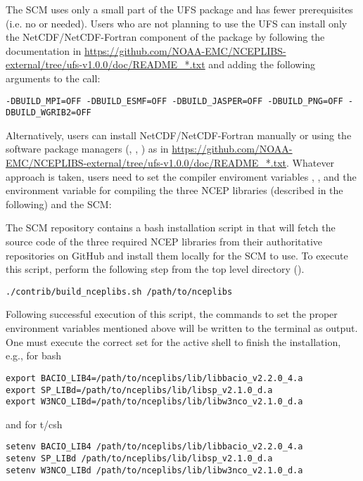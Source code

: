 The SCM uses only a small part of the UFS  package and has fewer prerequisites (i.e. no  or  needed). Users who are not planning to use the UFS can install only the NetCDF/NetCDF-Fortran component of the  package by following the documentation in \url{https://github.com/NOAA-EMC/NCEPLIBS-external/tree/ufs-v1.0.0/doc/README_*.txt} and adding the following arguments to the  call:
\begin{lstlisting}
-DBUILD_MPI=OFF -DBUILD_ESMF=OFF -DBUILD_JASPER=OFF -DBUILD_PNG=OFF -DBUILD_WGRIB2=OFF
\end{lstlisting}
Alternatively, users can install NetCDF/NetCDF-Fortran manually or using the software package managers (, , ) as in \url{https://github.com/NOAA-EMC/NCEPLIBS-external/tree/ufs-v1.0.0/doc/README_*.txt}. Whatever approach is taken, users need to set the compiler enviroment variables ,  ,  and the environment variable  for compiling the three NCEP libraries (described in the following) and the SCM:

The SCM repository contains a bash installation script in  that will fetch the source code of the three required NCEP libraries from their authoritative repositories on GitHub and install them locally for the SCM to use. To execute this script, perform the following step from the top level directory (). 
\begin{lstlisting}
./contrib/build_nceplibs.sh /path/to/nceplibs
\end{lstlisting}

Following successful execution of this script, the commands to set the proper environment variables mentioned above will be written to the terminal as output. One must execute the correct set for the active shell to finish the installation, e.g., for bash
\begin{lstlisting}
export BACIO_LIB4=/path/to/nceplibs/lib/libbacio_v2.2.0_4.a
export SP_LIBd=/path/to/nceplibs/lib/libsp_v2.1.0_d.a
export W3NCO_LIBd=/path/to/nceplibs/lib/libw3nco_v2.1.0_d.a
\end{lstlisting}
and for t/csh
\begin{lstlisting}
setenv BACIO_LIB4 /path/to/nceplibs/lib/libbacio_v2.2.0_4.a
setenv SP_LIBd /path/to/nceplibs/lib/libsp_v2.1.0_d.a
setenv W3NCO_LIBd /path/to/nceplibs/lib/libw3nco_v2.1.0_d.a
\end{lstlisting}

